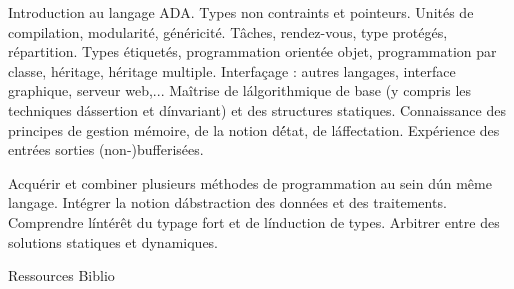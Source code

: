 {
Introduction au langage ADA. Types non contraints et pointeurs. Unités de compilation, modularité, généricité.
Tâches, rendez-vous, type protégés, répartition. Types étiquetés, programmation orientée objet, programmation par classe, héritage, héritage multiple.
Interfaçage : autres langages, interface graphique, serveur web,... 
} 
{Maîtrise de l\'algorithmique de base (y compris les techniques d\'assertion et d\'invariant) et des structures statiques.
Connaissance des principes de gestion mémoire, de la notion d\'état, de l\'affectation.
Expérience des entrées sorties (non-)bufferisées. } 
{\begin{itemize}
 \ObjItem Acquérir et combiner plusieurs méthodes de programmation au sein d\'un même langage.
 \ObjItem Intégrer la notion d\'abstraction des données et des traitements.
 \ObjItem Comprendre l\'intérêt du typage fort et de l\'induction de types.
 \ObjItem Arbitrer entre des solutions statiques et dynamiques. 
\end{itemize} 
} 
{Ressources} 
{Biblio} 
 
\vfill

